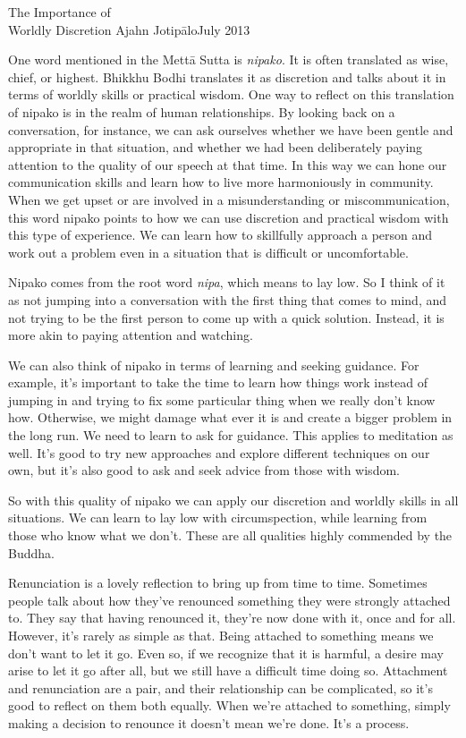 {The Importance of\\Worldly Discretion}
{Ajahn Jotipālo}{July 2013}

One word mentioned in the Mettā Sutta is \emph{nipako}. It is often 
translated as wise, chief, or highest. Bhikkhu Bodhi translates it as 
discretion and talks about it in terms of worldly skills or practical 
wisdom. One way to reflect on this translation of nipako is in the 
realm of human relationships. By looking back on a conversation, for 
instance, we can ask ourselves whether we have been gentle and 
appropriate in that situation, and whether we had been deliberately 
paying attention to the quality of our speech at that time. In this way 
we can hone our communication skills and learn how to live more 
harmoniously in community. When we get upset or are involved in a 
misunderstanding or miscommunication, this word nipako points to how we 
can use discretion and practical wisdom with this type of experience. 
We can learn how to skillfully approach a person and work out a problem 
even in a situation that is difficult or uncomfortable.

Nipako comes from the root word \emph{nipa}, which means to lay low. So 
I think of it as not jumping into a conversation with the first thing 
that comes to mind, and not trying to be the first person to come up 
with a quick solution. Instead, it is more akin to paying attention and 
watching.

We can also think of nipako in terms of learning and seeking guidance. 
For example, it's important to take the time to learn how things work 
instead of jumping in and trying to fix some particular thing when we 
really don't know how. Otherwise, we might damage what ever it is and 
create a bigger problem in the long run. We need to learn to ask for 
guidance. This applies to meditation as well. It's good to try new 
approaches and explore different techniques on our own, but it's also 
good to ask and seek advice from those with wisdom.

So with this quality of nipako we can apply our discretion and worldly 
skills in all situations. We can learn to lay low with circumspection, 
while learning from those who know what we don't. These are all 
qualities highly commended by the Buddha.


Renunciation is a lovely reflection to bring up from time to time. 
Sometimes people talk about how they've renounced something they were 
strongly attached to. They say that having renounced it, they're now 
done with it, once and for all. However, it's rarely as simple as that. 
Being attached to something means we don't want to let it go. Even so, 
if we recognize that it is harmful, a desire may arise to let it go 
after all, but we still have a difficult time doing so. Attachment and 
renunciation are a pair, and their relationship can be complicated, so 
it's good to reflect on them both equally. When we're attached to 
something, simply making a decision to renounce it doesn't mean we're 
done. It's a process.

